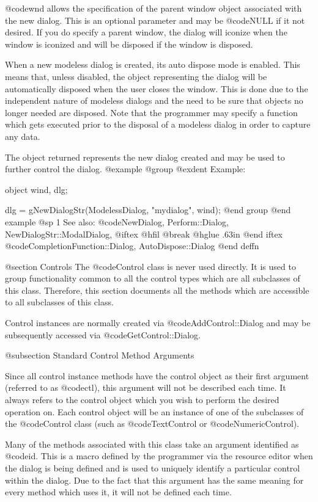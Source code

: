 @code{wnd} allows the specification of the parent window object associated
with the new dialog.  This is an optional parameter and may be @code{NULL}
if it not desired.  If you do specify a parent window, the dialog will
iconize when the window is iconized and will be disposed if the window
is disposed.

When a new modeless dialog is created, its auto dispose mode is enabled.
This means that, unless disabled, the object representing the dialog
will be automatically disposed when the user closes the window.  This
is done due to the independent nature of modeless dialogs and the need
to be sure that objects no longer needed are disposed.  Note that the
programmer may specify a function which gets executed prior to the
disposal of a modeless dialog in order to capture any data.

The object returned represents the new dialog created and may be
used to further control the dialog.
@example
@group
@exdent Example:

object  wind, dlg;

dlg = gNewDialogStr(ModelessDialog, "mydialog", wind);
@end group
@end example
@sp 1
See also:  @code{NewDialog, Perform::Dialog, NewDialogStr::ModalDialog,}
@iftex
@hfil @break @hglue .63in 
@end iftex
@code{CompletionFunction::Dialog, AutoDispose::Dialog}
@end deffn






@section Controls
The @code{Control} class is never used directly.  It is used to group
functionality common to all the control types which are all subclasses
of this class.  Therefore, this section documents all the methods which
are accessible to all subclasses of this class.


Control instances are normally created via @code{AddControl::Dialog}
and may be subsequently accessed via @code{GetControl::Dialog}.



@subsection  Standard Control Method Arguments

Since all control instance methods have the control object as their
first argument (referred to as @code{ctl}), this argument will not be
described each time.  It always refers to the control object which you
wish to perform the desired operation on.  Each control object will be
an instance of one of the subclasses of the @code{Control} class (such
as @code{TextControl} or @code{NumericControl}).


Many of the methods associated with this class take an argument
identified as @code{id}.  This is a macro defined by the programmer via
the resource editor when the dialog is being defined and is used to
uniquely identify a particular control within the dialog.  Due to the
fact that this argument has the same meaning for every method which
uses it, it will not be defined each time.


